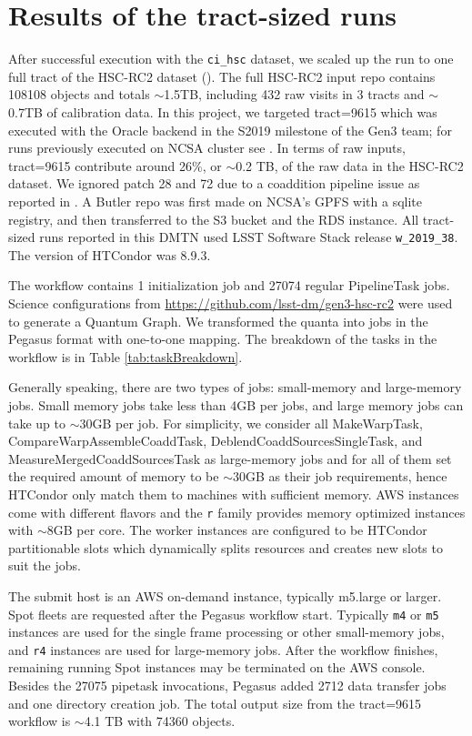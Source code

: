 \section{Results of the tract-sized runs}

After successful execution with the \texttt{ci\_hsc} dataset, we scaled up the run to one full tract of the HSC-RC2 dataset ().
The full HSC-RC2 input repo contains 108108 objects and totals $\sim$1.5TB, including 432 raw visits in 3 tracts and $\sim$0.7TB of calibration data.
In this project, we targeted tract=9615 which was executed with the Oracle backend in the S2019 milestone of the Gen3 team; for runs previously executed on NCSA cluster see .
In terms of raw inputs, tract=9615 contribute around 26$\%$, or $\sim$0.2 TB, of the raw data in the HSC-RC2 dataset.
We ignored patch 28 and 72 due to a coaddition pipeline issue as reported in .
A Butler repo was first made on NCSA's GPFS with a sqlite registry, and then transferred to the S3 bucket and the RDS instance.
All tract-sized runs reported in this DMTN used LSST Software Stack release \texttt{w\_2019\_38}.
The version of HTCondor was 8.9.3.

The workflow contains 1 initialization job and 27074 regular PipelineTask jobs.
Science configurations from \url{https://github.com/lsst-dm/gen3-hsc-rc2} were used to generate a Quantum Graph.
We transformed the quanta into jobs in the Pegasus format with one-to-one mapping.
The breakdown of the tasks in the workflow is in Table \ref{tab:taskBreakdown}.



Generally speaking, there are two types of jobs: small-memory and large-memory jobs.
Small memory jobs take less than 4GB per jobs, and large memory jobs can take up to $\sim$30GB per job.
For simplicity, we consider all MakeWarpTask, CompareWarpAssembleCoaddTask, DeblendCoaddSourcesSingleTask, and MeasureMergedCoaddSourcesTask as large-memory jobs and for all of them set the required amount of memory to be $\sim$30GB as their job requirements, hence HTCondor only match them to machines with sufficient memory.
AWS instances come with different flavors and the \texttt{r} family provides memory optimized instances with $\sim$8GB per core.
The worker instances are configured to be HTCondor partitionable slots which dynamically splits resources and creates new slots to suit the jobs.

The submit host is an AWS on-demand instance, typically m5.large or larger.
Spot fleets are requested after the Pegasus workflow start.
Typically \texttt{m4} or \texttt{m5} instances are used for the single frame processing or other small-memory jobs, and \texttt{r4} instances are used for large-memory jobs.
After the workflow finishes, remaining running Spot instances may be terminated on the AWS console.
Besides the 27075 pipetask invocations, Pegasus added 2712 data transfer jobs and one directory creation job.
The total output size from the tract=9615 workflow is $\sim$4.1 TB with 74360 objects.

